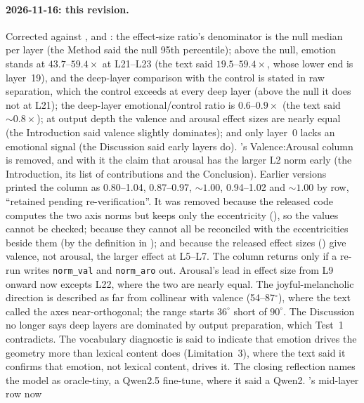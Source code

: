 \documentclass[11pt,a4paper]{article}
\begin{document}
\paragraph{2026-11-16: this revision.}
Corrected against ,
 and
: the effect-size ratio's
denominator is the null median per layer (the Method said the null 95th
percentile); above the null, emotion stands at $43.7$--$59.4\times$ at
L21--L23 (the text said $19.5$--$59.4\times$, whose lower end is
layer~19), and the deep-layer comparison with the control is stated in
raw separation, which the control exceeds at every deep layer (above the
null it does not at L21); the deep-layer emotional/control ratio is
$0.6$--$0.9\times$ (the text said ${\sim}0.8\times$); at output depth the
valence and arousal effect sizes are nearly equal (the Introduction said
valence slightly dominates); and only layer~0 lacks an emotional signal
(the Discussion said early layers do).
's Valence:Arousal column is removed, and with it
the claim that arousal has the larger L2 norm early (the Introduction,
its list of contributions and the Conclusion). Earlier versions printed
the column as 0.80--1.04, 0.87--0.97, ${\sim}1.00$, 0.94--1.02 and
${\sim}1.00$ by row, ``retained pending re-verification''. It was removed
because the released code computes the two axis norms but keeps only the
eccentricity (), so the values
cannot be checked; because they cannot all be reconciled with the
eccentricities beside them (by the definition in
); and because the released effect sizes
() give valence, not arousal, the
larger effect at L5--L7. The column returns only if a re-run writes
\texttt{norm\_val} and \texttt{norm\_aro} out.
Arousal's lead in effect size from L9 onward now excepts L22, where the
two are nearly equal.
The joyful-melancholic direction is described as far from collinear
with valence (54--87$^\circ$), where the text called the axes
near-orthogonal; the range starts $36^\circ$ short of $90^\circ$.
The Discussion no longer says deep layers are dominated by output
preparation, which Test~1 contradicts.
The vocabulary diagnostic is said to indicate that emotion drives the
geometry more than lexical content does (Limitation~3), where the text
said it confirms that emotion, not lexical content, drives it.
The closing reflection names the model as oracle-tiny, a Qwen2.5
fine-tune, where it said a Qwen2. 's mid-layer row now
\end{document}
